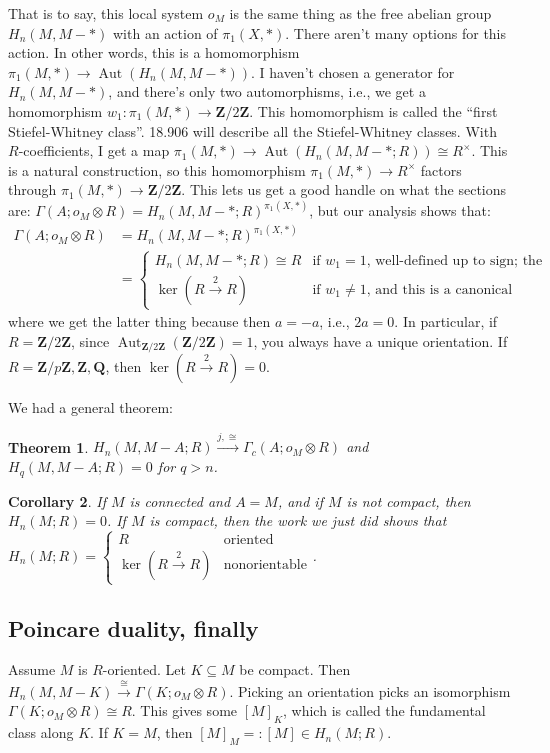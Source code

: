 \documentclass{amsart}
\theoremstyle{theorem}
\newtheorem{theorem}{Theorem}[section]
\newtheorem{corollary}[theorem]{Corollary}
\theoremstyle{definition}
\DeclareMathOperator{\Aut}{Aut}
\def\QQ{\mathbf Q}\def\RR{\mathbf R}\def\SS{\mathbb S}\def\TT{\mathbb T}
\newcommand{\Z}{\mathbf Z}
\begin{document}
That is to say, this local system $o_M$ is the same thing as the free abelian group $H_n(M,M-\ast)$ with an action of $\pi_1(X,\ast)$. There aren't many options for this action. In other words, this is a homomorphism $\pi_1(M,\ast)\to \Aut(H_n(M,M-\ast))$. I haven't chosen a generator for $H_n(M,M-\ast)$, and there's only two automorphisms, i.e., we get a homomorphism $w_1:\pi_1(M,\ast)\to\Z/2\Z$. This homomorphism is called the ``first Stiefel-Whitney class''. 18.906 will describe all the Stiefel-Whitney classes. With $R$-coefficients, I get a map $\pi_1(M,\ast)\to \Aut(H_n(M,M-\ast;R))\cong R^\times$. This is a natural construction, so this homomorphism $\pi_1(M,\ast)\to R^\times$ factors through $\pi_1(M,\ast)\to\Z/2\Z$. This lets us get a good handle on what the sections are: $\Gamma(A;o_M\otimes R)=H_n(M,M-\ast;R)^{\pi_1(X,\ast)}$, but our analysis shows that:
\begin{align*}
\Gamma(A;o_M\otimes R) & =H_n(M,M-\ast;R)^{\pi_1(X,\ast)}\\
& =\begin{cases}
H_n(M,M-\ast;R)\cong R & \text{if }w_1=1\text{, well-defined up to sign; the orientable case}\\
\ker(R\xrightarrow{2}R) & \text{if }w_1\neq 1\text{, and this is a canonical identification}
\end{cases}
\end{align*}
where we get the latter thing because then $a=-a$, i.e., $2a=0$. In particular, if $R=\Z/2\Z$, since $\Aut_{\Z/2\Z}(\Z/2\Z)=1$, you always have a unique orientation. If $R=\Z/p\Z,\Z,\QQ$, then $\ker(R\xrightarrow{2}R)=0$.

We had a general theorem:
\begin{theorem}
$H_n(M,M-A;R)\xrightarrow{j,\cong}\Gamma_c(A;o_M\otimes R)$ and $H_q(M,M-A;R)=0$ for $q>n$.
\end{theorem}
\begin{corollary}
If $M$ is connected and $A=M$, and if $M$ is not compact, then $H_n(M;R)=0$. If $M$ is compact, then the work we just did shows that $H_n(M;R)=\begin{cases}R & \text{oriented} \\ \ker(R\xrightarrow{2}R) & \text{nonorientable}\end{cases}$.
\end{corollary}
\subsection{Poincare duality, finally}
Assume $M$ is $R$-oriented. Let $K\subseteq M$ be compact. Then $H_n(M,M-K)\xrightarrow{\cong}\Gamma(K;o_M\otimes R)$. Picking an orientation picks an isomorphism $\Gamma(K;o_M\otimes R)\cong R$. This gives some $[M]_K$, which is called the fundamental class along $K$. If $K=M$, then $[M]_M=:[M]\in H_n(M;R)$.
\end{document}
